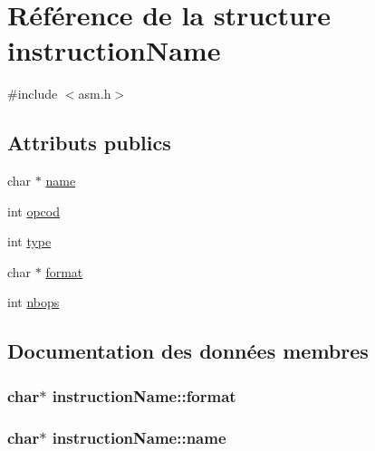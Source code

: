 \hypertarget{structinstructionName}{}\section{Référence de la structure instruction\+Name}
\label{structinstructionName}


{\ttfamily \#include $<$asm.\+h$>$}

\subsection*{Attributs publics}
\begin{DoxyCompactItemize}
\item 
char $\ast$ \hyperlink{structinstructionName_adc814711203e570b23cdddc6eb4e8ba8}{name}
\item 
int \hyperlink{structinstructionName_a56fd802379b5c3d00a83cf4915b14de7}{opcod}
\item 
int \hyperlink{structinstructionName_a343ced7f4083a1a399a5195b5c6bc8a8}{type}
\item 
char $\ast$ \hyperlink{structinstructionName_abb0bc8249c6cce11dbf9cd72c8028f1f}{format}
\item 
int \hyperlink{structinstructionName_aecc3848e91d527de92cea2cd25c652d4}{nbops}
\end{DoxyCompactItemize}


\subsection{Documentation des données membres}
\subsubsection[{\texorpdfstring{format}{format}}]{\setlength{\rightskip}{0pt plus 5cm}char$\ast$ instruction\+Name\+::format}\hypertarget{structinstructionName_abb0bc8249c6cce11dbf9cd72c8028f1f}{}\label{structinstructionName_abb0bc8249c6cce11dbf9cd72c8028f1f}
\subsubsection[{\texorpdfstring{name}{name}}]{\setlength{\rightskip}{0pt plus 5cm}char$\ast$ instruction\+Name\+::name}\hypertarget{structinstructionName_adc814711203e570b23cdddc6eb4e8ba8}{}\label{structinstructionName_adc814711203e570b23cdddc6eb4e8ba8}
